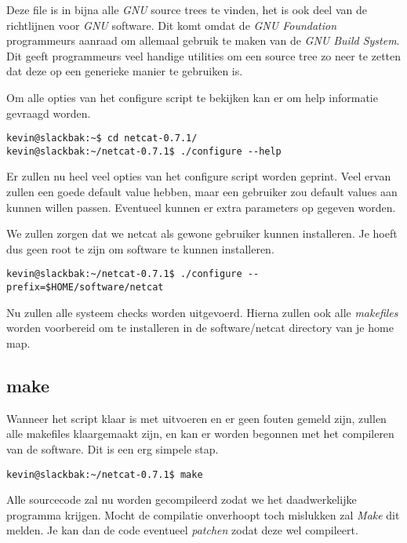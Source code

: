 Deze file is in bijna alle \emph{GNU} source trees te vinden, het is ook deel van de richtlijnen voor \emph{GNU} software. Dit komt omdat de \emph{GNU Foundation} programmeurs aanraad om allemaal gebruik te maken van de \emph{GNU Build System}\cite{bib.gnu.autotools}. Dit geeft programmeurs veel handige utilities om een source tree zo neer te zetten dat deze op een generieke manier te gebruiken is. 

Om alle opties van het configure script te bekijken kan er om help informatie gevraagd worden.
\begin{lstlisting}
kevin@slackbak:~$ cd netcat-0.7.1/
kevin@slackbak:~/netcat-0.7.1$ ./configure --help
\end{lstlisting}
Er zullen nu heel veel opties van het configure script worden geprint. Veel ervan zullen een goede default value hebben, maar een gebruiker zou default values aan kunnen willen passen. Eventueel kunnen er extra parameters op gegeven worden. 

We zullen zorgen dat we netcat als gewone gebruiker kunnen installeren. Je hoeft dus geen root te zijn om software te kunnen installeren. 
\begin{lstlisting}
kevin@slackbak:~/netcat-0.7.1$ ./configure --prefix=$HOME/software/netcat
\end{lstlisting}
Nu zullen alle systeem checks worden uitgevoerd. Hierna zullen ook alle \emph{makefiles} worden voorbereid om te installeren in de software/netcat directory van je home map. 

\subsection{make}
Wanneer het script klaar is met uitvoeren en er geen fouten gemeld zijn, zullen alle makefiles klaargemaakt zijn, en kan er worden begonnen met het compileren van de software. Dit is een erg simpele stap.
\begin{lstlisting}
kevin@slackbak:~/netcat-0.7.1$ make
\end{lstlisting}%
Alle sourcecode zal nu worden gecompileerd zodat we het daadwerkelijke programma krijgen. Mocht de compilatie onverhoopt toch mislukken zal \emph{Make} dit melden. Je kan dan de code eventueel \emph{patchen} zodat deze wel compileert. 

